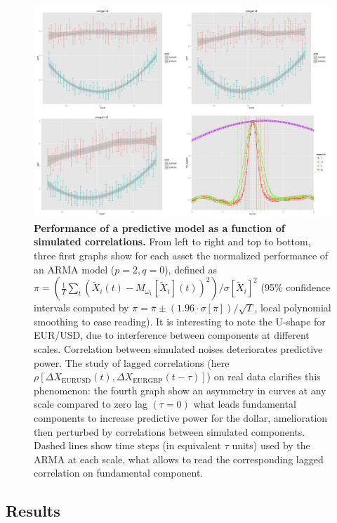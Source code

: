 \documentclass{article}
\begin{document}
\begin{figure}[h!]
\includegraphics[width=\linewidth]{C-syntheticdata-model_perf.jpg}
\caption{\textbf{Performance of a predictive model as a function of simulated correlations.} From left to right and top to bottom, three first graphs show for each asset the normalized performance of an ARMA model ($p=2,q=0$), defined as $\pi = \left(\frac{1}{T}\sum_t\left(\tilde{X}_i(t) - M_{\omega_1}\left[\tilde{X}_i\right](t)\right)^2 \right) / \sigma \left[ \tilde{X}_i \right]^2$ (95\% confidence intervals computed by $\pi = \bar{\pi} \pm (1.96\cdot \sigma [\pi])/\sqrt{T}$, local polynomial smoothing to ease reading). It is interesting to note the U-shape for EUR/USD, due to interference between components at different scales. Correlation between simulated noises deteriorates predictive power. The study of lagged correlations (here $\rho [\Delta X_{\textrm{EURUSD}}(t),\Delta X_{\textrm{EURGBP}}(t-\tau)]$) on real data clarifies this phenomenon: the fourth graph show an asymmetry in curves at any scale compared to zero lag $(\tau = 0)$ what leads fundamental components to increase predictive power for the dollar, amelioration then perturbed by correlations between simulated components. Dashed lines show time steps (in equivalent $\tau$ units) used by the ARMA at each scale, what allows to read the corresponding lagged correlation on fundamental component.\label{fig:model_perf}}
\end{figure}



\subsection*{Results}
\end{document}
